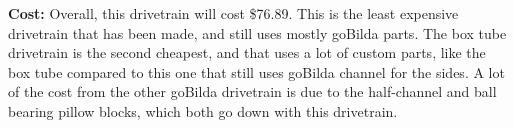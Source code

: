 
\par \textbf{Cost:} Overall, this drivetrain will cost \$76.89. This is the least expensive drivetrain that has been made, and still uses mostly goBilda parts. The box tube drivetrain is the second cheapest, and that uses a lot of custom parts, like the box tube compared to this one that still uses goBilda channel for the sides. A lot of the cost from the other goBilda drivetrain is due to the half-channel and ball bearing pillow blocks, which both go down with this drivetrain.


\newpage


